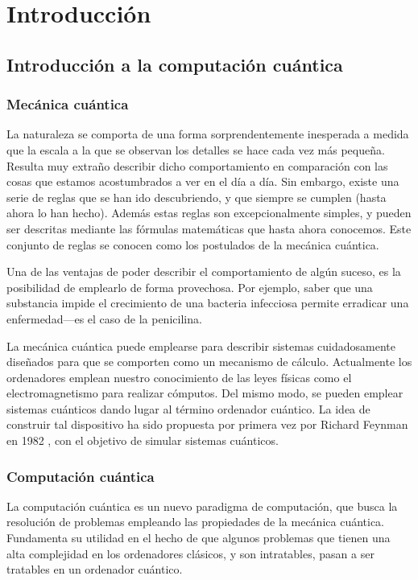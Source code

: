 \chapter{Introducción}
\section{Introducción a la computación cuántica}

\subsection{Mecánica cuántica}
La naturaleza se comporta de una forma sorprendentemente inesperada a medida que 
la escala a la que se observan los detalles se hace cada vez más pequeña.  
Resulta muy extraño describir dicho comportamiento en comparación con las cosas 
que estamos acostumbrados a ver en el día a día. Sin embargo, existe una serie 
de reglas que se han ido descubriendo, y que siempre se cumplen (hasta ahora lo 
han hecho). Además estas reglas son excepcionalmente simples, y pueden ser 
descritas mediante las fórmulas matemáticas que hasta ahora conocemos. Este 
conjunto de reglas se conocen como los postulados de la mecánica cuántica.

Una de las ventajas de poder describir el comportamiento de algún suceso, es la 
posibilidad de emplearlo de forma provechosa. Por ejemplo, saber que una 
substancia impide el crecimiento de una bacteria infecciosa permite erradicar 
una enfermedad---es el caso de la penicilina.

La mecánica cuántica puede emplearse para describir sistemas cuidadosamente 
diseñados para que se comporten como un mecanismo de cálculo. Actualmente los 
ordenadores emplean nuestro conocimiento de las leyes físicas como el 
electromagnetismo para realizar cómputos. Del mismo modo, se pueden emplear 
sistemas cuánticos dando lugar al término ordenador cuántico. La idea de 
construir tal dispositivo ha sido propuesta por primera vez por Richard Feynman 
en 1982 \cite{feynman-sim}, con el objetivo de simular sistemas cuánticos.

\subsection{Computación cuántica}
La computación cuántica es un nuevo paradigma de computación, que busca la
resolución de problemas empleando las propiedades de la mecánica cuántica.
Fundamenta su utilidad en el hecho de que algunos problemas que tienen una alta
complejidad en los ordenadores clásicos, y son intratables, pasan a ser
tratables en un ordenador cuántico.

